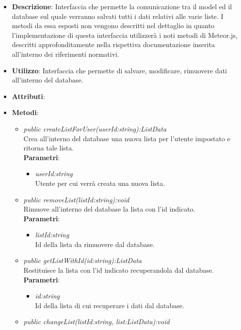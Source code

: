 \begin{itemize}
\item \textbf{Descrizione}: Interfaccia che permette la comunicazione tra il model ed il database sul quale verranno salvati tutti i dati relativi alle varie liste. I metodi da essa esposti non vengono descritti nel dettaglio in quanto l'implementazione di questa interfaccia utilizzerà i noti metodi di Meteor.js, descritti approfonditamente nella rispettiva documentazione inserita all'interno dei riferimenti normativi.
\item \textbf{Utilizzo}: Interfaccia che permette di salvare, modificare, rimuovere dati all'interno del database.
\item \textbf{Attributi}: 
\item \textbf{Metodi}:
	\begin{itemize}
	\item \textit{public createListForUser(userId:string):ListData}\\
		Crea all'interno del database una nuova lista per l'utente impostato e ritorna tale lista.
			\\ \textbf{Parametri}: \begin{itemize}
			\item \textit{userId:string}\\
			Utente per cui verrà creata una nuova lista.
			\end{itemize} 
	\item \textit{public removeList(listId:string):void}\\
	Rimuove all'interno del database la lista con l'id indicato.
			\\ \textbf{Parametri}: \begin{itemize}
			\item \textit{listId:string}\\
				Id della lista da rimuovere dal database.
			\end{itemize} 
	\item \textit{public getListWithId(id:string):ListData}\\
	Restituisce la lista con l'id indicato recuperandola dal database.
			\\ \textbf{Parametri}: \begin{itemize}
			\item \textit{id:string}\\
			Id della lista di cui recuperare i dati dal database.
			\end{itemize} 
	\item \textit{public changeList(listId:string, list:ListData):void}\\

\end{itemize}
\end{itemize}
